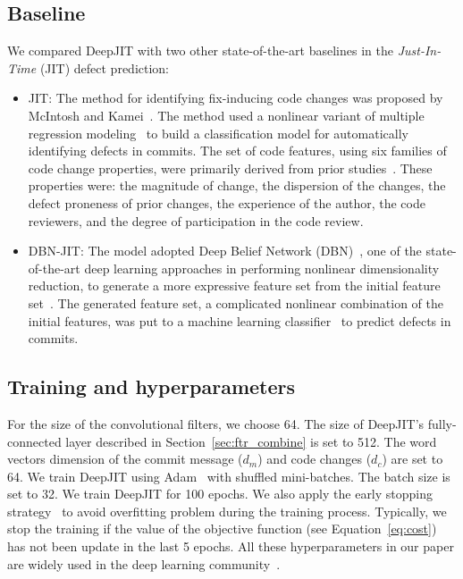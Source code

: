 \subsection{Baseline}
\label{sec:baseline}
We compared DeepJIT with two other state-of-the-art baselines in the \emph{Just-In-Time} (JIT) defect prediction:
\begin{itemize}
\item JIT: The method for identifying fix-inducing code changes was proposed by McIntosh and Kamei~\cite{mcintosh2018fix}. The method used a nonlinear variant of multiple regression modeling~\cite{fox1997applied} to build a classification model for automatically identifying defects in commits. The set of code features, using six families of code change properties, were primarily derived from prior studies~\cite{Kamei:2013:LES, Kim:2008:CSC, Kononenko:2015, Mockus2000}. These properties were: the magnitude of change, the dispersion of the changes, the defect proneness of prior changes, the experience of the author, the code reviewers, and the degree of participation in the code review. 
\item DBN-JIT: The model adopted Deep Belief Network (DBN)~\cite{hinton2006reducing}, one of the state-of-the-art deep learning approaches in performing nonlinear dimensionality reduction, to generate a more expressive feature set from the initial feature set~\cite{Yang:2015:DLJ}. The generated feature set, a complicated nonlinear combination of the initial features, was put to a machine learning classifier~\cite{nasrabadi2007pattern} to predict defects in commits. 
\end{itemize}

\subsection{Training and hyperparameters}
\label{sec:training_parameters}
For the size of the convolutional filters, we choose 64. The size of DeepJIT's fully-connected layer described in Section~\ref{sec:ftr_combine} is set to 512. The word vectors dimension of the commit message ($d_m$) and code changes ($d_c$) are set to 64. We train DeepJIT using Adam~\cite{kingma2014adam} with shuffled mini-batches.  The batch size is set to 32. We train DeepJIT for 100 epochs. We also apply the early stopping strategy~\cite{prechelt1998automatic, caruana2001overfitting} to avoid overfitting problem during the training process. Typically, we stop the training if the value of the objective function (see Equation~\ref{eq:cost}) has not been update in the last 5 epochs. All these hyperparameters in our paper are widely used in the deep learning community~\cite{severyn2015learning, huo2016learning, huo2017enhancing, hinton2012improving}. 
 
